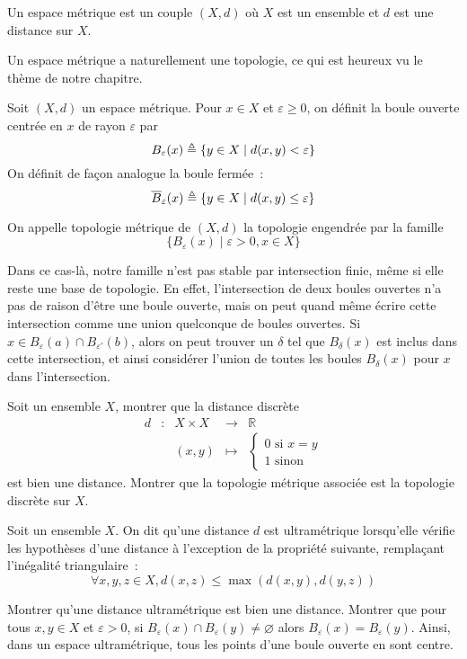 \begin{definition}
  Un espace métrique est un couple $(X,d)$ où $X$ est un ensemble et $d$ est une
  distance sur $X$.
\end{definition}

Un espace métrique a naturellement une topologie, ce qui est heureux vu le
thème de notre chapitre.

\begin{definition}
  Soit $(X,d)$ un espace métrique. Pour $x\in X$ et $\varepsilon \geq 0$, on
  définit la boule ouverte centrée en $x$ de rayon $\varepsilon$ par
  \[B_\varepsilon(x) \triangleq \{y\in X \mid d(x,y) < \varepsilon\}\]
  On définit de façon analogue la boule fermée~:
  \[\overline{B}_\varepsilon(x)\triangleq\{y\in X \mid d(x,y)\leq\varepsilon\}\]

  On appelle topologie métrique de $(X,d)$ la topologie engendrée par la
  famille
  \[\{B_\varepsilon(x) \mid \varepsilon > 0, x \in X \}\]
\end{definition}

\begin{remark}
  Dans ce cas-là, notre famille n'est pas stable par intersection finie, même
  si elle reste une base de topologie. En effet, l'intersection de deux boules
  ouvertes n'a pas de raison d'être une boule ouverte, mais on peut quand même
  écrire cette intersection comme une union quelconque de boules ouvertes.
  Si $x \in B_\varepsilon(a) \cap B_{\varepsilon'}(b)$, alors on peut trouver
  un $\delta$ tel que $B_\delta(x)$ est inclus dans cette intersection, et ainsi
  considérer l'union de toutes les boules $B_\delta(x)$ pour $x$ dans
  l'intersection.
\end{remark}

\begin{exercise}
  Soit un ensemble $X$, montrer que la distance discrète
  \[\begin{array}{ccccc}
  d & : & X \times X & \longrightarrow & \mathbb R\\
  & & (x,y) & \longmapsto &
  \begin{cases}
    0\text{ si } x = y\\
    1\text{ sinon}
  \end{cases}
  \end{array}\]
  est bien une distance. Montrer que la topologie métrique associée est la
  topologie discrète sur $X$.
\end{exercise}

\begin{exercise}
  Soit un ensemble $X$. On dit qu'une distance $d$ est ultramétrique lorsqu'elle
  vérifie les hypothèses d'une distance à l'exception de la propriété suivante,
  remplaçant l'inégalité triangulaire~:
  \[\forall x,y,z\in X, d(x,z)\leq \max(d(x,y),d(y,z))\]

  Montrer qu'une distance ultramétrique est bien une distance. Montrer que pour
  tous $x,y\in X$ et $\varepsilon > 0$, si
  $B_\varepsilon(x)\cap B_\varepsilon(y)\neq\varnothing$ alors
  $B_\varepsilon(x) = B_\varepsilon(y)$. Ainsi, dans un espace ultramétrique, tous
  les points d'une boule ouverte en sont centre.
\end{exercise}

